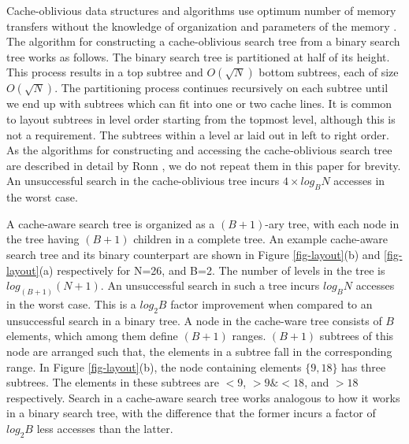 \documentclass[10pt, conference]{IEEEtran}
\begin{document}
\begin{figure*}[!t]
\caption{Search trees for a sorted list of 26 elements with contents
  $[1,2,\ldots,26]$ in a memory layout of sorted list (left) and cache
  aware layout (right).}
\label{fig-layout}
\end{figure*}

Cache-oblivious data structures and algorithms use optimum number of memory transfers without the knowledge of organization and parameters of the memory \cite{frigo1999cache}. The algorithm for constructing a cache-oblivious search tree from a binary search tree works as follows. The binary search tree is partitioned at half of its height. This process results in a top subtree and $O(\sqrt{N})$ bottom subtrees, each of size $O(\sqrt{N})$. The partitioning process continues recursively on each subtree until we end up with subtrees which can fit into one or two cache lines. It is common to layout subtrees in level order starting from the topmost level, although this is not a requirement. The subtrees within a level ar laid out in left to right order. As the algorithms for constructing and accessing the cache-oblivious search tree are described in detail by Ronn \cite{ronn2003cache}, we do not repeat them in this paper for brevity. An unsuccessful search in the cache-oblivious tree incurs $4 \times log_BN$ accesses in the worst case.

A cache-aware search tree is organized as a $(B+1)$-ary tree, with each node in the tree having $(B+1)$ children in a complete tree. An example cache-aware search tree and its binary counterpart are shown in Figure \ref{fig-layout}(b) and \ref{fig-layout}(a) respectively for N=26, and B=2. The number of levels in the tree is $log_{(B+1)}{(N+1)}$. An unsuccessful search in such a tree incurs $log_BN$ accesses in the worst case. This is a $log_2B$ factor improvement when compared to an unsuccessful search in a binary tree. A node in the cache-ware tree consists of $B$ elements, which among them define $(B+1)$ ranges. $(B+1)$ subtrees of this node are arranged such that, the elements in a subtree fall in the corresponding range. In  Figure \ref{fig-layout}(b), the node containing elements $\{9,18\}$ has three subtrees. The elements in these subtrees are $<9$, $>9\&<18$, and $>18$ respectively. Search in a cache-aware search tree works analogous to how it works in a binary search tree, with the difference that the former incurs a factor of $log_2B$ less accesses than the latter.
\end{document}
